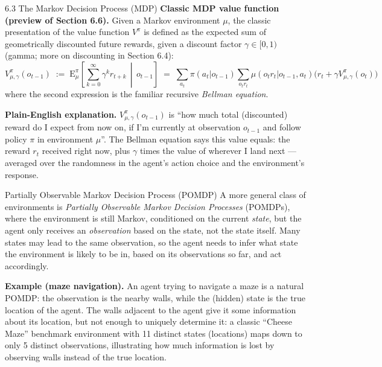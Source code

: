 \documentclass[aspectratio=169,10pt]{beamer}
\begin{document}
\begin{frame}[allowframebreaks]{6.3 The Markov Decision Process (MDP)}
\vspace{0.2cm}
\textbf{Classic MDP value function (preview of Section 6.6).} Given a
Markov environment $\mu$, the classic presentation of the value function
$V^\pi$ is defined as the expected sum of geometrically discounted future
rewards, given a discount factor $\gamma \in [0,1)$ (gamma; more on
discounting in Section 6.4):
\[
  V^{\pi}_{\mu,\gamma}(o_{t-1}) \;:=\;
  \mathrm{E}^\pi_\mu\!\left[\sum_{k=0}^{\infty} \gamma^k r_{t+k}\,\middle|\,o_{t-1}\right]
  \;=\;
  \sum_{a_t}\pi(a_t|o_{t-1})\sum_{o_t r_t}\mu(o_t r_t|o_{t-1},a_t)
  \Big(r_t + \gamma V^{\pi}_{\mu,\gamma}(o_t)\Big)
\]
where the second expression is the familiar recursive \emph{Bellman
equation}.

\textbf{Plain-English explanation.} $V^\pi_{\mu,\gamma}(o_{t-1})$ is ``how
much total (discounted) reward do I expect from now on, if I'm currently at
observation $o_{t-1}$ and follow policy $\pi$ in environment $\mu$''. The
Bellman equation says this value equals: the reward $r_t$ received right
now, plus $\gamma$ times the value of wherever I land next --- averaged
over the randomness in the agent's action choice and the environment's
response.

\framebreak

\begin{block}{Partially Observable Markov Decision Process (POMDP)}
A more general class of environments is \emph{Partially Observable Markov
Decision Processes} (POMDPs), where the environment is still Markov,
conditioned on the current \emph{state}, but the agent only receives an
\emph{observation} based on the state, not the state itself. Many states
may lead to the same observation, so the agent needs to infer what state
the environment is likely to be in, based on its observations so far, and
act accordingly.
\end{block}

\textbf{Example (maze navigation).} An agent trying to navigate a maze is a
natural POMDP: the observation is the nearby walls, while the (hidden)
state is the true location of the agent. The walls adjacent to the agent
give it some information about its location, but not enough to uniquely
determine it: a classic ``Cheese Maze'' benchmark environment with 11
distinct states (locations) maps down to only 5 distinct observations,
illustrating how much information is lost by observing walls instead of
the true location.


\end{frame}
\end{document}
